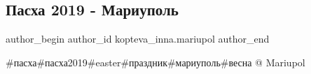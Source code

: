  
 
 
 
 

\subsection{Пасха 2019 - Мариуполь}
\label{sec:29_04_2019.fb.kopteva_inna.mariupol.1.pasha_2019_mariupol}

\ifcmt
 author_begin
   author_id kopteva_inna.mariupol
 author_end
\fi

\#пасха\#пасха2019\#easter\#праздник\#мариуполь\#весна @ Mariupol
